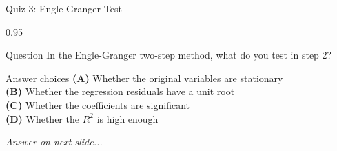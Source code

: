 \documentclass[9pt, aspectratio=169, t]{beamer}
\begin{document}
\begin{frame}{Quiz 3: Engle-Granger Test}
    \begin{cminipage}{0.95\textwidth}
    \begin{alertblock}{Question}
        In the Engle-Granger two-step method, what do you test in step 2?
    \end{alertblock}

    \vspace{0.4cm}

    \begin{block}{Answer choices}
        \textcolor{MainBlue}{\textbf{(A)}} Whether the original variables are stationary\\[3pt]
        \textcolor{MainBlue}{\textbf{(B)}} Whether the regression residuals have a unit root\\[3pt]
        \textcolor{MainBlue}{\textbf{(C)}} Whether the coefficients are significant\\[3pt]
        \textcolor{MainBlue}{\textbf{(D)}} Whether the $R^2$ is high enough
    \end{block}

    \vspace{0.5cm}

    \begin{center}
        \textit{Answer on next slide...}
    \end{center}
    \end{cminipage}
\end{frame}
\end{document}
